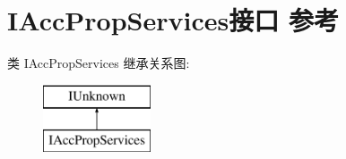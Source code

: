 \hypertarget{interface_i_acc_prop_services}{}\section{I\+Acc\+Prop\+Services接口 参考}
\label{interface_i_acc_prop_services}
类 I\+Acc\+Prop\+Services 继承关系图\+:\begin{figure}[H]
\begin{center}
\leavevmode
\includegraphics[height=2.000000cm]{interface_i_acc_prop_services}
\end{center}
\end{figure}
